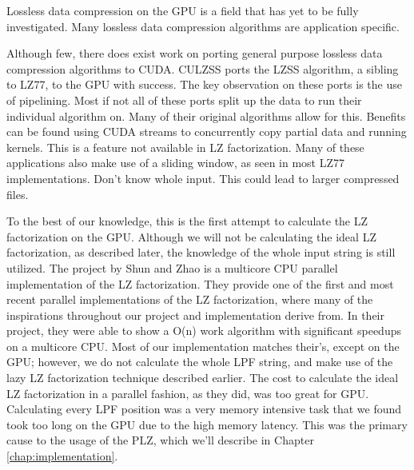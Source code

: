 Lossless data compression on the GPU is a field that has yet to be fully investigated.
Many lossless data compression algorithms are application specific.

Although few, there does exist work on porting general purpose lossless data compression algorithms to CUDA.
CULZSS ports the LZSS algorithm, a sibling to LZ77, to the GPU with success.
The key observation on these ports is the use of pipelining.
Most if not all of these ports split up the data to run their individual algorithm on.
Many of their original algorithms allow for this.
Benefits can be found using CUDA streams to concurrently copy partial data and running kernels.
This is a feature not available in LZ factorization.
Many of these applications also make use of a sliding window, as seen in most LZ77 implementations.
Don't know whole input.
This could lead to larger compressed files.


To the best of our knowledge, this is the first attempt to calculate the LZ factorization on the GPU.
Although we will not be calculating the ideal LZ factorization, as described later, the knowledge of the whole input string is still utilized.
The project by Shun and Zhao\cite{shun2013practical} is a multicore CPU parallel implementation of the LZ factorization.
They provide one of the first and most recent parallel implementations of the LZ factorization, where many of the inspirations throughout our project and implementation derive from.
In their project, they were able to show a O(n) work algorithm with significant speedups on a multicore CPU.
Most of our implementation matches their's, except on the GPU; however, we do not calculate the whole LPF string, and make use of the lazy LZ factorization technique described earlier.
The cost to calculate the ideal LZ factorization in a parallel fashion, as they did, was too great for GPU.
Calculating every LPF position was a very memory intensive task that we found took too long on the GPU due to the high memory latency.
This was the primary cause to the usage of the PLZ, which we'll describe in Chapter \ref{chap:implementation}.



